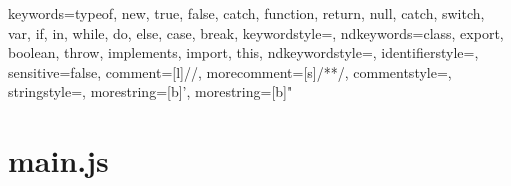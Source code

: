 
{
  keywords={typeof, new, true, false, catch, function, return, null, catch, switch, var, if, in, while, do, else, case, break},
  keywordstyle=\color{blue}\ttfamily,
  ndkeywords={class, export, boolean, throw, implements, import, this},
  ndkeywordstyle=\color{darkgray}\ttfamily,
  identifierstyle=\color{black},
  sensitive=false,
  comment=[l]{//},
  morecomment=[s]{/*}{*/},
  commentstyle=\color{purple}\ttfamily,
  stringstyle=\color{red}\ttfamily,
  morestring=[b]',
  morestring=[b]"
}

	\section{main.js}
	
	
	
